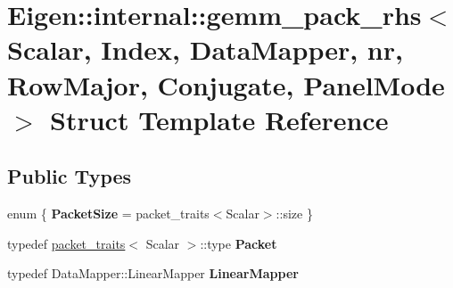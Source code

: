 \hypertarget{struct_eigen_1_1internal_1_1gemm__pack__rhs_3_01_scalar_00_01_index_00_01_data_mapper_00_01nr_00b7f2442d9ba6129104d4662213736528}{}\section{Eigen\+::internal\+::gemm\+\_\+pack\+\_\+rhs$<$ Scalar, Index, Data\+Mapper, nr, Row\+Major, Conjugate, Panel\+Mode $>$ Struct Template Reference}
\label{struct_eigen_1_1internal_1_1gemm__pack__rhs_3_01_scalar_00_01_index_00_01_data_mapper_00_01nr_00b7f2442d9ba6129104d4662213736528}
\subsection*{Public Types}
\begin{DoxyCompactItemize}
\item 
\mbox{\label{struct_eigen_1_1internal_1_1gemm__pack__rhs_3_01_scalar_00_01_index_00_01_data_mapper_00_01nr_00b7f2442d9ba6129104d4662213736528_a7249161aced68d4d28b9ad7e5779dad1}} 
enum \{ {\bfseries Packet\+Size} = packet\+\_\+traits$<$Scalar$>$\+::size
 \}
\item 
\mbox{\label{struct_eigen_1_1internal_1_1gemm__pack__rhs_3_01_scalar_00_01_index_00_01_data_mapper_00_01nr_00b7f2442d9ba6129104d4662213736528_afd72ad123e2688ecd4d0c11306e6a27a}} 
typedef \mbox{\hyperlink{struct_eigen_1_1internal_1_1packet__traits}{packet\+\_\+traits}}$<$ Scalar $>$\+::type {\bfseries Packet}
\item 
\mbox{\label{struct_eigen_1_1internal_1_1gemm__pack__rhs_3_01_scalar_00_01_index_00_01_data_mapper_00_01nr_00b7f2442d9ba6129104d4662213736528_a0202b0880d0b70b13b35b716740dbfa1}} 
typedef Data\+Mapper\+::\+Linear\+Mapper {\bfseries Linear\+Mapper}
\end{DoxyCompactItemize}
